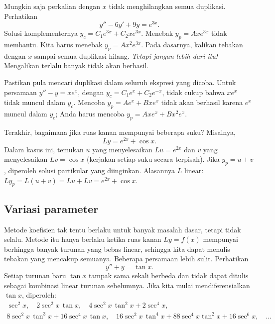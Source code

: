 \medskip

Mungkin saja perkalian dengan $x$ tidak menghilangkan semua duplikasi. Perhatikan
\begin{equation*}
y''-6y'+9y = e^{3x} .
\end{equation*}
Solusi komplementernya $y_c = C_1 e^{3x} + C_2 x e^{3x}$. Menebak $y_p=A xe^{3x}$ tidak membantu. Kita harus menebak $y_p = Ax^2e^{3x}$. Pada dasarnya, kalikan tebakan dengan $x$ sampai semua duplikasi hilang. \emph{Tetapi jangan lebih dari itu!} Mengalikan terlalu banyak tidak akan berhasil.

Pastikan pula mencari duplikasi dalam seluruh ekspresi yang dicoba. Untuk persamaan $y''-y=xe^x$, dengan $y_c = C_1e^x + C_2e^{-x}$, tidak cukup bahwa $xe^x$ tidak muncul dalam $y_c$. Mencoba $y_p=Ae^x+Bxe^x$ tidak akan berhasil karena $e^x$ muncul dalam $y_c$; Anda harus mencoba $y_p=Axe^x+Bx^2e^x$.

\medskip

Terakhir, bagaimana jika ruas kanan mempunyai beberapa suku? Misalnya,
\begin{equation*}
Ly = e^{2x} + \cos x .
\end{equation*}
Dalam kasus ini, temukan $u$ yang menyelesaikan $Lu = e^{2x}$ dan $v$ yang menyelesaikan $Lv = \cos x$ (kerjakan setiap suku secara terpisah). Jika $y_p = u+ v$, diperoleh solusi partikular yang diinginkan. Alasannya $L$ linear: $Ly_p = L(u+v) = Lu + Lv = e^{2x} + \cos x$.

\subsection{Variasi parameter}

Metode koefisien tak tentu berlaku untuk banyak masalah dasar, tetapi tidak selalu. Metode itu hanya berlaku ketika ruas kanan $Ly = f(x)$ mempunyai berhingga banyak turunan yang bebas linear, sehingga kita dapat menulis tebakan yang mencakup semuanya. Beberapa persamaan lebih sulit. Perhatikan
\begin{equation*}
y''+y = \tan x .
\end{equation*}
Setiap turunan baru $\tan x$ tampak sama sekali berbeda dan tidak dapat ditulis sebagai kombinasi linear turunan sebelumnya. Jika kita mulai mendiferensialkan $\tan x$, diperoleh:
\begin{multline*}
\sec^2 x, \quad
2\sec^2 x \, \tan x, \quad
4 \sec^2 x \, \tan^2 x + 2 \sec^4 x, \\
8 \sec^2 x \, \tan^3 x + 16 \sec^4 x \, \tan x, \quad
16\sec^2 x \, \tan^4 x + 88 \sec^4 x \tan^2 x + 16 \sec^6 x, \quad
\ldots
\end{multline*}

